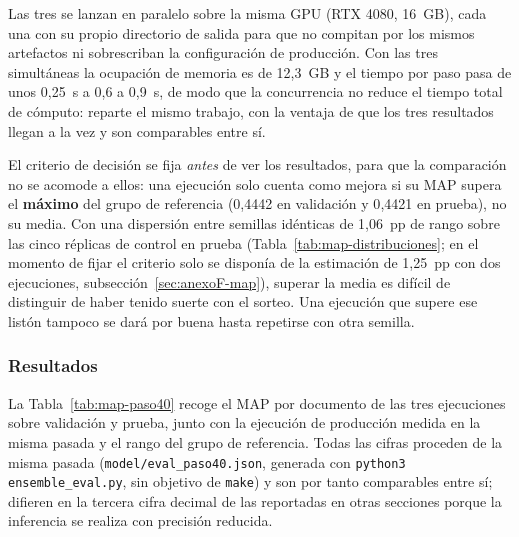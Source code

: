 Las tres se lanzan en paralelo sobre la misma GPU (RTX 4080, 16~GB), cada una con su propio directorio de salida para que no compitan por los mismos artefactos ni sobrescriban la configuración de producción. Con las tres simultáneas la ocupación de memoria es de 12{,}3~GB y el tiempo por paso pasa de unos 0{,}25~s a 0{,}6 a 0{,}9~s, de modo que la concurrencia no reduce el tiempo total de cómputo: reparte el mismo trabajo, con la ventaja de que los tres resultados llegan a la vez y son comparables entre sí.

El criterio de decisión se fija \emph{antes} de ver los resultados, para que la comparación no se acomode a ellos: una ejecución solo cuenta como mejora si su MAP supera el \textbf{máximo} del grupo de referencia (0{,}4442 en validación y 0{,}4421 en prueba), no su media. Con una dispersión entre semillas idénticas de 1,06~pp de rango sobre las cinco réplicas de control en prueba (Tabla~\ref{tab:map-distribuciones}; en el momento de fijar el criterio solo se disponía de la estimación de 1,25~pp con dos ejecuciones, subsección~\ref{sec:anexoF-map}), superar la media es difícil de distinguir de haber tenido suerte con el sorteo. Una ejecución que supere ese listón tampoco se dará por buena hasta repetirse con otra semilla.

\subsubsection*{Resultados}

La Tabla~\ref{tab:map-paso40} recoge el MAP por documento de las tres ejecuciones sobre validación y prueba, junto con la ejecución de producción medida en la misma pasada y el rango del grupo de referencia. Todas las cifras proceden de la misma pasada (\texttt{model/\allowbreak eval\_paso40.json}, generada con \texttt{python3 ensemble\_eval.py}, sin objetivo de \texttt{make}) y son por tanto comparables entre sí; difieren en la tercera cifra decimal de las reportadas en otras secciones porque la inferencia se realiza con precisión reducida.

